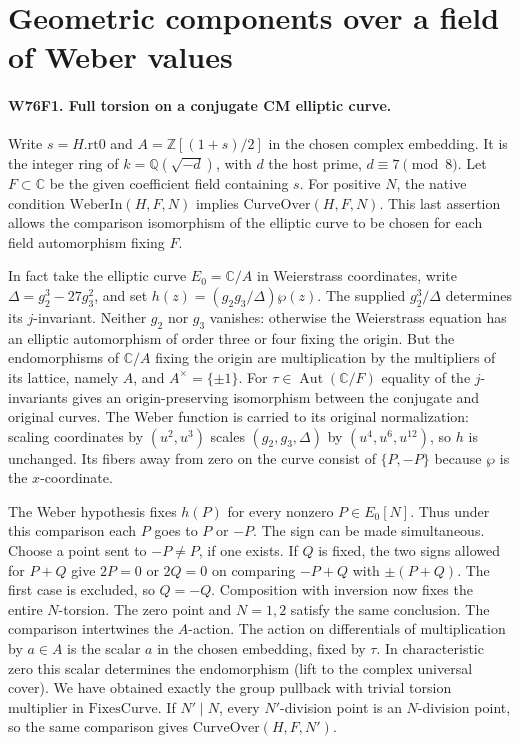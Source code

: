 \section{Geometric components over a field of Weber values}

\paragraph{W76F1. Full torsion on a conjugate CM elliptic curve.}
Write $s=H.\mathrm{rt0}$ and $A=\mathbb Z[(1+s)/2]$ in the
chosen complex embedding. It is the integer ring of
$k=\mathbb Q(\sqrt{-d})$, with $d$ the host prime,
$d\equiv7\pmod8$. Let $F\subset\mathbb C$ be the given coefficient
field containing $s$. For positive $N$, the native condition
$\mathrm{WeberIn}(H,F,N)$ implies $\mathrm{CurveOver}(H,F,N)$.
This last assertion allows the comparison isomorphism of the
elliptic curve to be chosen for each field automorphism fixing $F$.

In fact take the elliptic curve $E_0=\mathbb C/A$ in
Weierstrass coordinates, write $\Delta=g_2^3-27g_3^2$, and
set $h(z)=(g_2g_3/\Delta)\wp(z)$. The supplied $g_2^3/\Delta$
determines its $j$-invariant. Neither $g_2$ nor $g_3$ vanishes:
otherwise the Weierstrass equation has an elliptic automorphism
of order three or four fixing the origin. But the endomorphisms
of $\mathbb C/A$ fixing the origin are multiplication by the
multipliers of its lattice, namely $A$, and $A^\times=\{\pm1\}$.
For $\tau\in\operatorname{Aut}(\mathbb C/F)$ equality of the
$j$-invariants gives an origin-preserving isomorphism between
the conjugate and original curves. The Weber function is carried
to its original normalization: scaling coordinates by
$(u^2,u^3)$ scales $(g_2,g_3,\Delta)$ by $(u^4,u^6,u^{12})$,
so $h$ is unchanged. Its fibers away from zero on the curve
consist of $\{P,-P\}$ because $\wp$ is the $x$-coordinate.

The Weber hypothesis fixes $h(P)$ for every nonzero
$P\in E_0[N]$. Thus under this comparison each $P$ goes to $P$
or $-P$. The sign can be made simultaneous. Choose a point sent
to $-P\ne P$, if one exists. If $Q$ is fixed, the two signs
allowed for $P+Q$ give $2P=0$ or $2Q=0$ on comparing
$-P+Q$ with $\pm(P+Q)$. The first case is excluded, so $Q=-Q$.
Composition with inversion now fixes the entire $N$-torsion.
The zero point and $N=1,2$ satisfy the same conclusion. The
comparison intertwines the $A$-action. The action on differentials
of multiplication by $a\in A$ is the scalar $a$ in the chosen
embedding, fixed by $\tau$. In characteristic zero this scalar
determines the endomorphism (lift to the complex universal cover).
We have obtained exactly the group pullback with trivial torsion
multiplier in $\mathrm{FixesCurve}$. If $N'\mid N$, every
$N'$-division point is an $N$-division point, so the same
comparison gives $\mathrm{CurveOver}(H,F,N')$.

